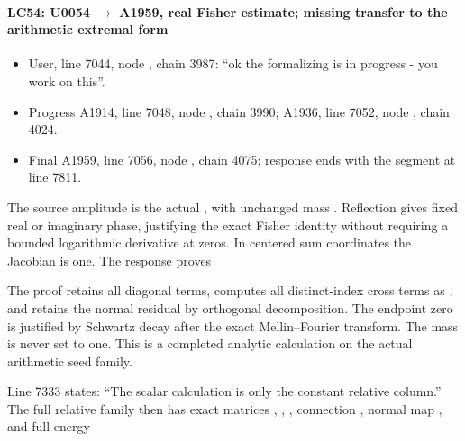 \paragraph{\texorpdfstring{LC54: U0054
\allowbreak{}\ensuremath{→}\allowbreak{} A1959, real Fisher estimate;
missing transfer to the arithmetic extremal
form}{LC54: U0054  A1959, real Fisher estimate; missing transfer to the arithmetic extremal form}}\label{lc54-u0054-a1959-real-fisher-estimate-missing-transfer-to-the-arithmetic-extremal-form}

\begin{itemize}
\tightlist
\item
  User, line 7044, node
  \protect{}, chain 3987: ``ok
  the formalizing is in progress - you work on this''.
\item
  Progress A1914, line 7048, node
  \protect{}, chain 3990;
  A1936, line 7052, node
  \protect{}, chain 4024.
\item
  Final A1959, line 7056, node
  \protect{}, chain 4075;
  response ends with the segment at line 7811.
\end{itemize}

The source amplitude is the actual
\protect{}, with unchanged mass
\protect{}. Reflection gives fixed real or imaginary
phase, justifying the exact Fisher identity without requiring a bounded
logarithmic derivative at zeros. In centered sum coordinates the
Jacobian is one. The response proves


The proof retains all diagonal terms, computes all distinct-index cross
terms as \protect{}, and
retains the normal residual by orthogonal decomposition. The endpoint
zero is justified by Schwartz decay after the exact Mellin--Fourier
transform. The mass is never set to one. This is a completed analytic
calculation on the actual arithmetic seed family.

Line 7333 states: ``The scalar calculation is only the constant relative
column.'' The full relative family then has exact matrices
\protect{}, \protect{},
\protect{}, connection
\protect{}, normal map
\protect{}, and full energy

